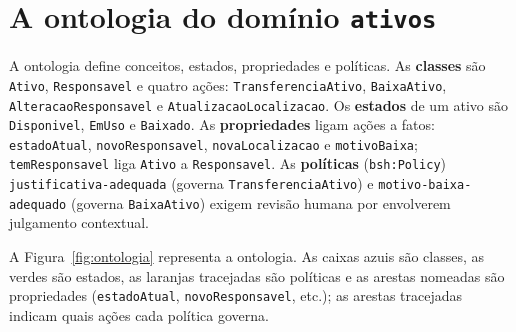 \documentclass[11pt,a4paper]{article}
\begin{document}
\section{A ontologia do domínio \texttt{ativos}}
A ontologia define conceitos, estados, propriedades e políticas. As \textbf{classes} são \texttt{Ativo}, \texttt{Responsavel} e quatro ações: \texttt{TransferenciaAtivo}, \texttt{BaixaAtivo}, \texttt{AlteracaoResponsavel} e \texttt{AtualizacaoLocalizacao}. Os \textbf{estados} de um ativo são \texttt{Disponivel}, \texttt{EmUso} e \texttt{Baixado}. As \textbf{propriedades} ligam ações a fatos: \texttt{estadoAtual}, \texttt{novoResponsavel}, \texttt{novaLocalizacao} e \texttt{motivoBaixa}; \texttt{temResponsavel} liga \texttt{Ativo} a \texttt{Responsavel}. As \textbf{políticas} (\texttt{bsh:Policy}) \texttt{justificativa-adequada} (governa \texttt{TransferenciaAtivo}) e \texttt{motivo-baixa-adequado} (governa \texttt{BaixaAtivo}) exigem revisão humana por envolverem julgamento contextual.

A Figura~\ref{fig:ontologia} representa a ontologia. As caixas azuis são classes, as verdes são estados, as laranjas tracejadas são políticas e as arestas nomeadas são propriedades (\texttt{estadoAtual}, \texttt{novoResponsavel}, etc.); as arestas tracejadas indicam quais ações cada política governa.
\end{document}
